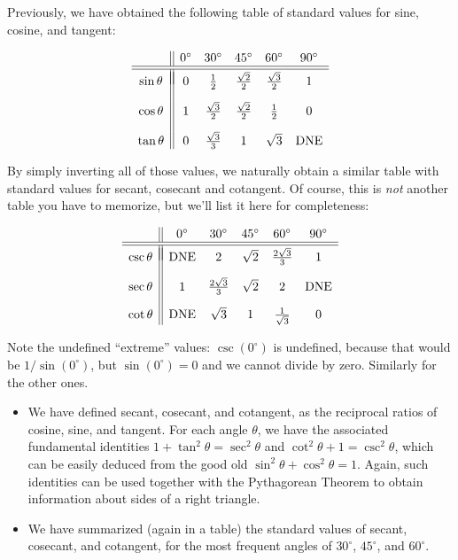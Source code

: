 \documentclass{ximera}
\begin{document}
Previously, we have obtained the following table of standard values for sine, cosine, and tangent:

$$
\begin{array}{c||ccccc}
 & 0^\circ & 30^\circ & 45^\circ & 60^\circ & 90^\circ \\
\hline\hline \\[-1em]  
\sin \theta & 0 & \frac{1}{2} & \frac{\sqrt{2}}{2} & \frac{\sqrt{3}}{2} & 1 \\[1em]
 \cos \theta & 1 & \frac{\sqrt{3}}{2} & \frac{\sqrt{2}}{2} & \frac{1}{2} & 0 \\[1em]
\tan\theta& 0 & \frac{\sqrt{3}}{3} & 1 & \sqrt{3} & {\rm DNE}
\end{array}
$$

By simply inverting all of those values, we naturally obtain a similar table with standard values for secant, cosecant and cotangent. Of course, this is \emph{not} another table you have to memorize, but we'll list it here for completeness:

$$
\begin{array}{c||ccccc}
 & 0^\circ & 30^\circ & 45^\circ & 60^\circ & 90^\circ \\
\hline\hline \\[-1em]  
\csc \theta & {\rm DNE} & 2 & \sqrt{2} & \frac{2\sqrt{3}}{3} & 1 \\[1em]
 \sec \theta & 1 & \frac{2\sqrt{3}}{3} & \sqrt{2} & 2 & {\rm DNE} \\[1em]
\cot\theta& {\rm DNE} & \sqrt{3} & 1 & \frac{1}{\sqrt{3}} & 0
\end{array}
$$

Note the undefined ``extreme'' values: $\csc(0^\circ)$ is undefined, because that would be $1/\sin(0^\circ)$, but $\sin(0^\circ) = 0$ and we cannot divide by zero. Similarly for the other ones.


\begin{summary}\begin{itemize}
\item We have defined secant, cosecant, and cotangent, as the reciprocal ratios of cosine, sine, and tangent. For each angle $\theta$, we have the associated fundamental identities $1+\tan^2\theta=\sec^2\theta$ and $\cot^2\theta + 1 = \csc^2\theta$, which can be easily deduced from the good old $\sin^2\theta+\cos^2\theta=1$. Again, such identities can be used together with the Pythagorean Theorem to obtain information about sides of a right triangle.
\item We have summarized (again in a table) the standard values of secant, cosecant, and cotangent, for the most frequent angles of $30^\circ$, $45^\circ$, and $60^\circ$.
\end{itemize}\end{summary}
\end{document}
